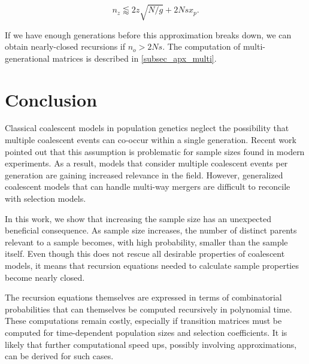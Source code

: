 \documentclass[review]{elsarticle}
\begin{document}
\begin{equation}
  n_z \lessapprox 2 z\sqrt{N/g} + 2N s x_p.
\label{eq_nzg}
\end{equation}

If we have enough generations before this approximation breaks down, we can obtain nearly-closed
recursions if $n_o> 2Ns$. The computation of multi-generational matrices is described in
\ref{subsec_apx_multi}.

\section{Conclusion}
\label{sec_conclusion}


Classical coalescent models in population genetics neglect the possibility that multiple coalescent events 
can co-occur within a single generation. 
Recent work \citep{BhaskarEtAl2014,NelsonEtAl2019} pointed out that this
assumption is problematic for sample sizes found in modern experiments. As a result, models
that consider multiple coalescent events per generation are gaining increased relevance in the field.
However, generalized coalescent models that can handle multi-way mergers are difficult to reconcile 
with selection models.

In this work, we show that increasing the sample size has an unexpected beneficial consequence. 
As sample size increases, the number of distinct parents relevant to a sample becomes, 
with high probability, smaller than the sample itself. Even though this does not rescue
all desirable properties of coalescent models, it means that recursion equations 
needed to calculate sample properties become nearly closed. 

The recursion equations themselves  are expressed in terms of combinatorial probabilities 
that can themselves be computed recursively in polynomial time. These computations 
remain costly, especially if transition matrices must be computed for time-dependent
population sizes and selection coefficients. It is likely that further computational 
speed ups, possibly involving approximations, can be derived for such cases.  
\end{document}
